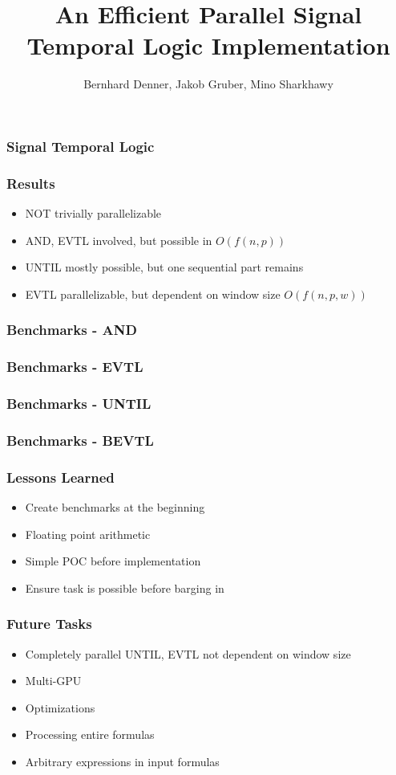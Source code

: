 \documentclass[notes=show]{beamer}
\title{An Efficient Parallel Signal Temporal Logic Implementation}
\author{
	Bernhard Denner,
	Jakob Gruber,
	Mino Sharkhawy
}
\begin{document}
\maketitle

\begin{frame}
\frametitle{Signal Temporal Logic}
\end{frame}

\begin{frame}
\frametitle{Results}
\begin{itemize}
\item NOT trivially parallelizable
\item AND, EVTL involved, but possible in $O(f(n,p))$
\item UNTIL mostly possible, but one sequential part remains
\item EVTL parallelizable, but dependent on window size $O(f(n,p,w))$
\end{itemize}
\end{frame}

\begin{frame}
\frametitle{Benchmarks - AND}
\end{frame}

\begin{frame}
\frametitle{Benchmarks - EVTL}
\end{frame}

\begin{frame}
\frametitle{Benchmarks - UNTIL}
\end{frame}

\begin{frame}
\frametitle{Benchmarks - BEVTL}
\end{frame}

\begin{frame}
\frametitle{Lessons Learned}
\begin{itemize}
\item Create benchmarks at the beginning
\item Floating point arithmetic
\item Simple POC before implementation
\item Ensure task is possible before barging in
\end{itemize}
\end{frame}

\begin{frame}
\frametitle{Future Tasks}
\begin{itemize}
\item Completely parallel UNTIL, EVTL not dependent on window size
\item Multi-GPU
\item Optimizations
\item Processing entire formulas
\item Arbitrary expressions in input formulas
\end{itemize}
\end{frame}
\end{document}
